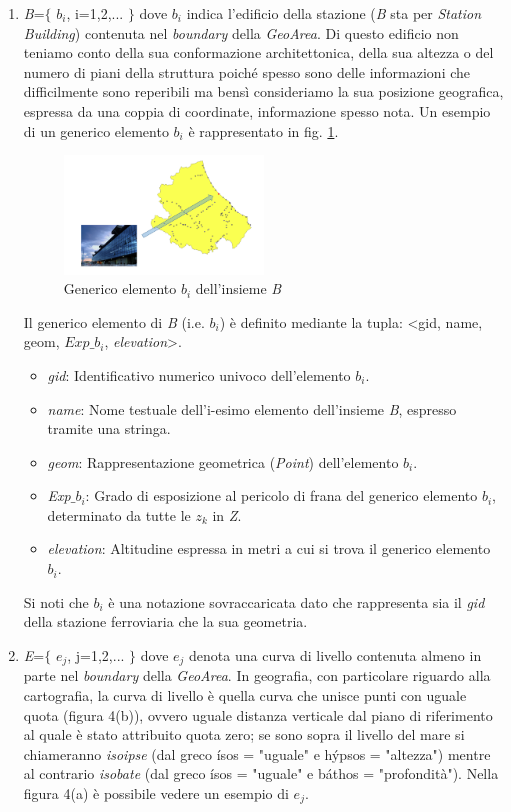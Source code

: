 \begin{enumerate}
\item\textit{B}=$\{$ $b_i$, i=1,2,... $\}$ dove $b_i$ indica l'edificio della stazione (\textit{B} sta per \textit{Station Building}) contenuta nel \textit{boundary} della \textit{GeoArea}. Di questo edificio non teniamo conto della sua conformazione architettonica, della sua altezza o del numero di piani della struttura poiché spesso sono delle informazioni che difficilmente sono reperibili ma bensì consideriamo la sua posizione geografica, espressa da una coppia di coordinate, informazione spesso nota. Un esempio di un generico elemento $b_i$ è rappresentato in fig. \ref{fig:b}.
\newpage
\begin{figure}[bht]
\centering
\includegraphics[width=0.5\textwidth]{img/stazionegenerica}
\caption{Generico elemento $b_i$ dell'insieme \textit{B}}
	\label{fig:b}
\end{figure}

Il generico elemento di \textit{B} (i.e. $b_i$) è definito mediante la tupla: <gid, name, geom, \textit{$Exp\_b_i$}, \textit{elevation}>.
\begin{itemize}
\item \textit{gid}: Identificativo numerico univoco dell'elemento $b_i$.
\item \textit{name}: Nome testuale dell'i-esimo elemento dell'insieme \textit{B}, espresso tramite una stringa.
\item \textit{geom}: Rappresentazione geometrica (\textit{Point}) dell'elemento $b_i$.
\item \textit{Exp$\_$$b_i$}: Grado di esposizione al pericolo di frana del generico elemento $b_i$, determinato da tutte le $z_k$ in \textit{Z}.
\item \textit{elevation}: Altitudine espressa in metri a cui si trova il generico elemento $b_i$.
\end{itemize}
Si noti che $b_i$ è una notazione sovraccaricata dato che rappresenta sia il \textit{gid} della stazione ferroviaria che la sua geometria.
\item\textit{E}=$\{$ $e_j$, j=1,2,... $\}$ dove $e_j$ denota una curva di livello contenuta almeno in parte nel \textit{boundary} della \textit{GeoArea}. In geografia, con particolare riguardo alla cartografia, la curva di livello è quella curva che unisce punti con uguale quota (figura 4(b)), ovvero uguale distanza verticale dal piano di riferimento al quale è stato attribuito quota zero; se sono sopra il livello del mare si chiameranno \textit{isoipse} (dal greco ísos = "uguale" e hýpsos = "altezza") mentre al contrario \textit{isobate} (dal greco ísos = "uguale" e báthos = "profondità"). Nella figura 4(a) è possibile vedere un esempio di $e_j$.


\end{enumerate}

